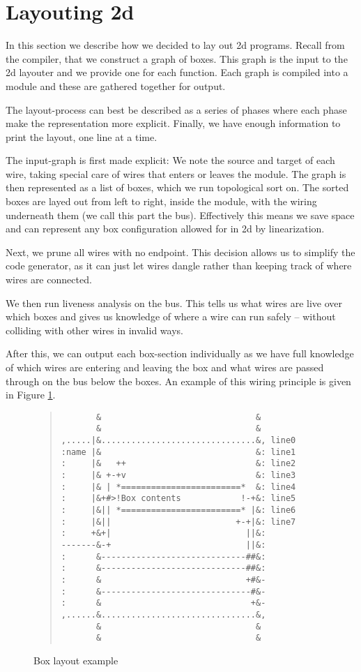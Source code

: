 \section{Layouting 2d}

In this section we describe how we decided to lay out 2d
programs. Recall from the compiler, that we construct a graph of
boxes. This graph is the input to the 2d layouter and we provide one
for each function. Each graph is compiled into a module and these are
gathered together for output.

The layout-process can best be described as a series of phases where
each phase make the representation more explicit. Finally, we have
enough information to print the layout, one line at a time.

The input-graph is first made explicit: We note the source and target
of each wire, taking special care of wires that enters or leaves the
module. The graph is then represented as a list of boxes, which we run
topological sort on. The sorted boxes are layed out from left to
right, inside the module, with the wiring underneath them (we call
this part the bus). Effectively this means we save space and can
represent any box configuration allowed for in 2d by linearization.

Next, we prune all wires with no endpoint. This decision allows us to
simplify the code generator, as it can just let wires dangle rather
than keeping track of where wires are connected.

We then run liveness analysis on the bus. This tells us what wires are
live over which boxes and gives us knowledge of where a wire can run
safely -- without colliding with other wires in invalid ways.

After this, we can output each box-section individually as we have
full knowledge of which wires are entering and leaving the box and
what wires are passed through on the bus below the boxes. An example
of this wiring principle is given in Figure \ref{fig:1}.
\begin{figure}
\begin{quote}
\begin{verbatim}
       &                               &
       &                               &
,.....|&...............................&, line0
:name |&                               &: line1
:     |&   ++                          &: line2
:     |& +-+v                          &: line3
:     |& | *========================*  &: line4
:     |&+#>!Box contents            !-+&: line5
:     |&|| *========================* |&: line6
:     |&||                         +-+|&: line7
:     +&+|                           ||&:
-------&-+                           ||&:
:      &-----------------------------##&:
:      &-----------------------------##&:
:      &                             +#&-
:      &------------------------------#&-
:      &                              +&-
,......&...............................&,
       &                               &
       &                               &
\end{verbatim}
  \end{quote}
  \caption{Box layout example}\label{fig:1}
\end{figure}

